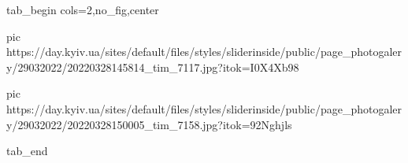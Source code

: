  
 
 
 
 

\ifcmt
  tab_begin cols=2,no_fig,center

     pic https://day.kyiv.ua/sites/default/files/styles/sliderinside/public/page_photogalery/29032022/20220328145814_tim_7117.jpg?itok=I0X4Xb98

		 pic https://day.kyiv.ua/sites/default/files/styles/sliderinside/public/page_photogalery/29032022/20220328150005_tim_7158.jpg?itok=92Nghjls

  tab_end
\fi
